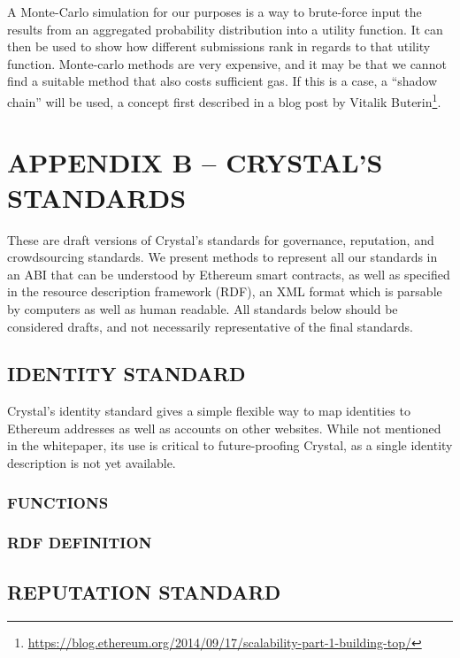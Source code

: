 A Monte-Carlo simulation for our purposes is a way to brute-force input
the results from an aggregated probability distribution into a utility
function. It can then be used to show how different submissions rank in
regards to that utility function. Monte-carlo methods are very
expensive, and it may be that we cannot find a suitable method that also
costs sufficient gas. If this is a case, a ``shadow chain'' will be
used, a concept first described in a blog post by Vitalik
Buterin\footnote{\url{https://blog.ethereum.org/2014/09/17/scalability-part-1-building-top/}}.

\section{ APPENDIX B -- CRYSTAL'S
STANDARDS}\label{appendix-b-crystals-standards}

These are draft versions of Crystal's standards for governance,
reputation, and crowdsourcing standards. We present methods to represent
all our standards in an ABI that can be understood by Ethereum smart
contracts, as well as specified in the resource description framework
(RDF), an XML format which is parsable by computers as well as human
readable. All standards below should be considered drafts, and not
necessarily representative of the final standards.

\subsection{IDENTITY STANDARD}\label{identity-standard}

Crystal's identity standard gives a simple flexible way to map
identities to Ethereum addresses as well as accounts on other websites.
While not mentioned in the whitepaper, its use is critical to
future-proofing Crystal, as a single identity description is not yet
available.

\subsubsection{FUNCTIONS}\label{functions}

\subsubsection{RDF DEFINITION}\label{rdf-definition}

\subsection{REPUTATION STANDARD}\label{reputation-standard}

